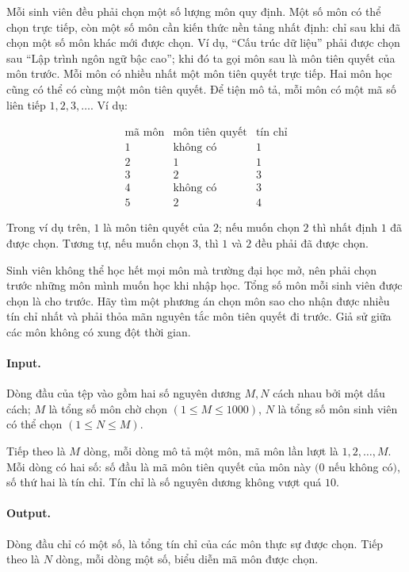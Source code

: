 \documentclass[11pt]{article}
\begin{document}
Mỗi sinh viên đều phải chọn một số lượng môn quy định. Một số môn có thể chọn
trực tiếp, còn một số môn cần kiến thức nền tảng nhất định: chỉ sau khi đã
chọn một số môn khác mới được chọn. Ví dụ, ``Cấu trúc dữ liệu'' phải được chọn
sau ``Lập trình ngôn ngữ bậc cao''; khi đó ta gọi môn sau là môn tiên quyết
của môn trước. Mỗi môn có nhiều nhất một môn tiên quyết trực tiếp. Hai môn học
cũng có thể có cùng một môn tiên quyết. Để tiện mô tả, mỗi môn có một mã số
liên tiếp \(1,2,3,\ldots\). Ví dụ:

\[
\begin{array}{c|c|c}
\text{mã môn} & \text{môn tiên quyết} & \text{tín chỉ}\\
\hline
1 & \text{không có} & 1\\
2 & 1 & 1\\
3 & 2 & 3\\
4 & \text{không có} & 3\\
5 & 2 & 4
\end{array}
\]

Trong ví dụ trên, \(1\) là môn tiên quyết của \(2\); nếu muốn chọn \(2\) thì
nhất định \(1\) đã được chọn. Tương tự, nếu muốn chọn \(3\), thì \(1\) và \(2\)
đều phải đã được chọn.

Sinh viên không thể học hết mọi môn mà trường đại học mở, nên phải chọn trước
những môn mình muốn học khi nhập học. Tổng số môn mỗi sinh viên được chọn là
cho trước. Hãy tìm một phương án chọn môn sao cho nhận được nhiều tín chỉ nhất
và phải thỏa mãn nguyên tắc môn tiên quyết đi trước. Giả sử giữa các môn không
có xung đột thời gian.

\paragraph{Input.}
Dòng đầu của tệp vào gồm hai số nguyên dương \(M,N\) cách nhau bởi một dấu
cách; \(M\) là tổng số môn chờ chọn \((1\le M\le 1000)\), \(N\) là tổng số môn
sinh viên có thể chọn \((1\le N\le M)\).

Tiếp theo là \(M\) dòng, mỗi dòng mô tả một môn, mã môn lần lượt là
\(1,2,\ldots,M\). Mỗi dòng có hai số: số đầu là mã môn tiên quyết của môn này
\((0\) nếu không có\()\), số thứ hai là tín chỉ. Tín chỉ là số nguyên dương
không vượt quá \(10\).

\paragraph{Output.}
Dòng đầu chỉ có một số, là tổng tín chỉ của các môn thực sự được chọn. Tiếp
theo là \(N\) dòng, mỗi dòng một số, biểu diễn mã môn được chọn.
\end{document}
